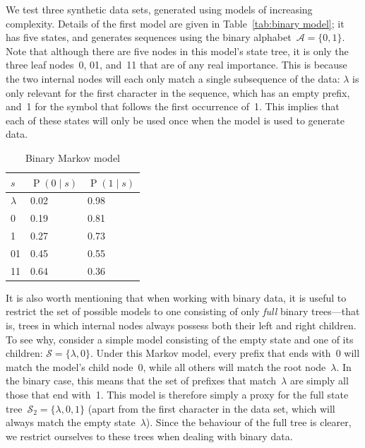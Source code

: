 \documentclass[12pt,a4paper]{article}
\newcommand\mc[1]{\mathcal{#1}}               %
\DeclareMathOperator\Pb{P}                    %
\begin{document}
We test three synthetic data sets, generated using models of increasing
complexity. Details of the first model are given in Table~\ref{tab:binary
model}; it has five states, and generates sequences using the binary
alphabet~\(\mc{A} = \{0, 1\}\). Note that although there are five nodes in this
model's state tree, it is only the three leaf nodes~0, 01, and~11 that are of
any real importance. This is because the two internal nodes will each only match
a single subsequence of the data: \(\lambda\) is only relevant for the first
character in the sequence, which has an empty prefix, and~1 for the symbol that
follows the first occurrence of~1. This implies that each of these states will
only be used once when the model is used to generate data.
%
\begin{table}[htbp]
\centering
\begin{tabular}{lll}
  \toprule
  \(s\)       & \(\Pb(0 \mid s)\) & \(\Pb(1 \mid s)\) \\
  \midrule
  \(\lambda\) & 0.02              & 0.98 \\
  0           & 0.19              & 0.81 \\
  1           & 0.27              & 0.73 \\
  01          & 0.45              & 0.55 \\
  11          & 0.64              & 0.36 \\
  \bottomrule
\end{tabular}
\caption{Binary Markov model}\label{tab:binary model}
\end{table}

It is also worth mentioning that when working with binary data, it is useful to
restrict the set of possible models to one consisting of only \emph{full} binary
trees---that is, trees in which internal nodes always possess both their left
and right children. To see why, consider a simple model consisting of the empty
state and one of its children: \(\mc{S} = \{\lambda, 0\}\). Under this Markov
model, every prefix that ends with~0 will match the model's child node~0, while
all others will match the root node~\(\lambda\). In the binary case, this means
that the set of prefixes that match~\(\lambda\) are simply all those that end
with~1. This model is therefore simply a proxy for the full state
tree~\(\mc{S}_2 = \{\lambda, 0, 1\}\) (apart from the first character in the
data set, which will always match the empty state~\(\lambda\)). Since the
behaviour of the full tree is clearer, we restrict ourselves to these trees when
dealing with binary data.
\end{document}
